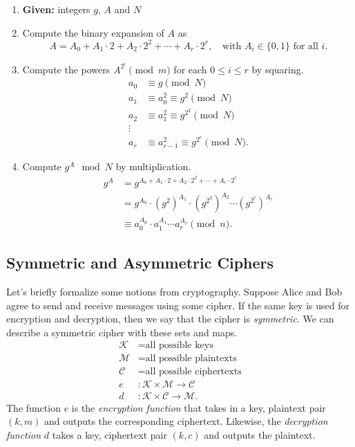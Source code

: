 \documentclass[12pt]{article}
\theoremstyle{plain}
\theoremstyle{definition}
\theoremstyle{remark}
\begin{document}
\begin{enumerate}
\item \textbf{Given: }integers $g$, $A$ and $N$
\item Compute the binary expansion of $A$ as 
\[
    A = A_0 + A_1\cdot 2 + A_2\cdot 2^2 + \cdots + A_r\cdot 2^r,\quad \text{with }A_i\in \{0,1\}\text{ for all }i.
\]
\item Compute the powers $A^{2^i}\pmod m$ for each $0\leq i \leq r$ by squaring.
    \begin{align*}
        a_0 &\equiv g\pmod N\\
        a_1 &\equiv a_0^2\equiv g^2\pmod N\\
        a_2 &\equiv a_1^2\equiv g^{2^2}\pmod N\\
        \vdots\\
        a_r &\equiv a_{r-1}^2\equiv g^{2^r}\pmod N.
    \end{align*}

\item Compute $g^A\mod N$ by multiplication.
    \begin{align*}
        g^A &= g^{A_0 + A_1\cdot 2 + A_2 \cdot 2^2 + \cdots + A_r\cdot 2^r}\\
        &= g^{A_0}\cdot (g^2)^{A_1}\cdot (g^{2^2})^{A_2}\cdots (g^{2^r})^{A_r}\\
        &\equiv a_0^{A_0}\cdot a_1^{A_1} \cdots a_r^{A_r}\pmod n.
    \end{align*}
\end{enumerate}








\addtocounter{subsection}{1}
\subsection{Symmetric and Asymmetric Ciphers}
Let's briefly formalize some notions from cryptography.
Suppose Alice and Bob agree to send and receive messages using some cipher.
If the same key is used for encryption and decryption, then we say that the cipher is \emph{symmetric}.
We can describe a symmetric cipher with these sets and maps.
\begin{align*}
    \mathcal{K} &= \text{all possible keys}\\
    \mathcal{M} &= \text{all possible plaintexts}\\
    \mathcal{C} &= \text{all possible ciphertexts}\\
    e &: \mathcal{K}\times \mathcal{M}\to \mathcal{C}\\
    d &: \mathcal{K}\times \mathcal{C}\to \mathcal{M}.
\end{align*}
The function $e$ is the \emph{encryption function} that takes in a key, plaintext pair $(k, m)$ and outputs the corresponding ciphertext.
Likewise, the \emph{decryption function} $d$ takes a key, ciphertext pair $(k, c)$ and outputs the plaintext.
\end{document}
